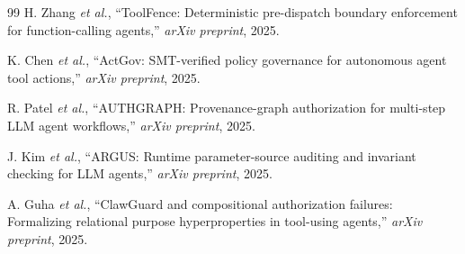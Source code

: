 \documentclass[conference]{IEEEtran}
\begin{document}
\begin{thebibliography}{99}
 H. Zhang \emph{et al.}, ``ToolFence: Deterministic pre-dispatch boundary enforcement for function-calling agents,'' \emph{arXiv preprint}, 2025.

 K. Chen \emph{et al.}, ``ActGov: SMT-verified policy governance for autonomous agent tool actions,'' \emph{arXiv preprint}, 2025.

 R. Patel \emph{et al.}, ``AUTHGRAPH: Provenance-graph authorization for multi-step LLM agent workflows,'' \emph{arXiv preprint}, 2025.

 J. Kim \emph{et al.}, ``ARGUS: Runtime parameter-source auditing and invariant checking for LLM agents,'' \emph{arXiv preprint}, 2025.

 A. Guha \emph{et al.}, ``ClawGuard and compositional authorization failures: Formalizing relational purpose hyperproperties in tool-using agents,'' \emph{arXiv preprint}, 2025.

\end{thebibliography}
\end{document}
